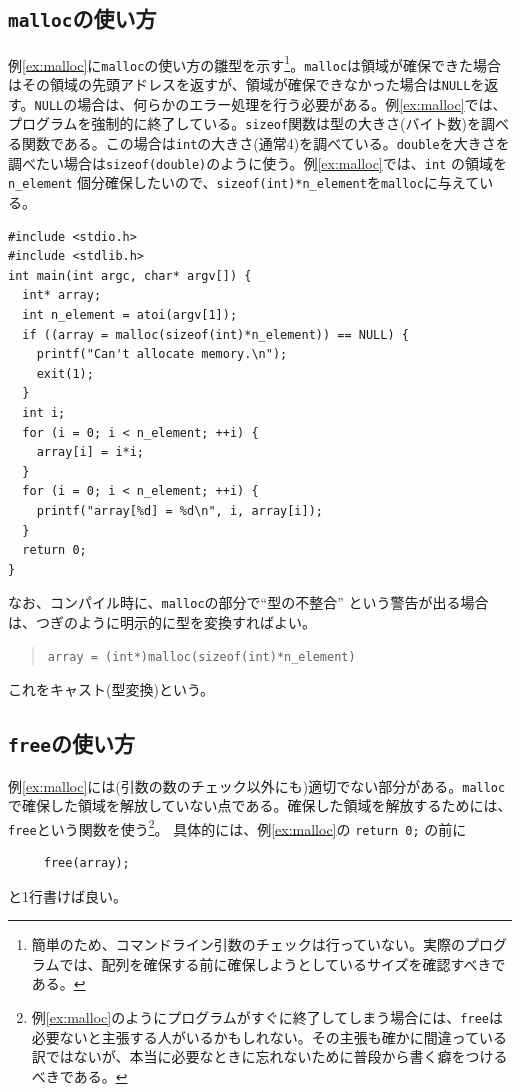 \subsection{{\tt malloc}の使い方}

例\ref{ex:malloc}に\verb|malloc|の使い方の雛型を示す\footnote{簡単のため、コマンドライン引数のチェックは行っていない。実際のプログラムでは、配列を確保する前に確保しようとしているサイズを確認すべきである。}。\verb|malloc|は領域が確保できた場合はその領域の先頭アドレスを返すが、領域が確保できなかった場合は\verb|NULL|を返す。\verb|NULL|の場合は、何らかのエラー処理を行う必要がある。例\ref{ex:malloc}では、プログラムを強制的に終了している。\verb|sizeof|関数は型の大きさ(バイト数)を調べる関数である。この場合は\verb|int|の大きさ(通常4)を調べている。\verb|double|を大きさを調べたい場合は\verb|sizeof(double)|のように使う。例\ref{ex:malloc}では、\verb|int| の領域を \verb|n_element| 個分確保したいので、\verb|sizeof(int)*n_element|を\verb|malloc|に与えている。
\begin{reidai}\label{ex:malloc}
\begin{verbatim}
#include <stdio.h>
#include <stdlib.h>
int main(int argc, char* argv[]) {
  int* array;
  int n_element = atoi(argv[1]);
  if ((array = malloc(sizeof(int)*n_element)) == NULL) {
    printf("Can't allocate memory.\n");
    exit(1);
  }
  int i;
  for (i = 0; i < n_element; ++i) {
    array[i] = i*i;
  }
  for (i = 0; i < n_element; ++i) {
    printf("array[%d] = %d\n", i, array[i]);
  }
  return 0;
}
\end{verbatim}
\end{reidai} \noindent
なお、コンパイル時に、{\tt malloc}の部分で``型の不整合'' という警告が出る場合は、つぎのように明示的に型を変換すればよい。
\begin{quote}
\begin{verbatim}
array = (int*)malloc(sizeof(int)*n_element)
\end{verbatim}
\end{quote}
これをキャスト(型変換)という。

\subsection{{\tt free}の使い方}

例\ref{ex:malloc}には(引数の数のチェック以外にも)適切でない部分がある。\verb|malloc|で確保した領域を解放していない点である。確保した領域を解放するためには、\verb|free|という関数を使う\footnote{例\ref{ex:malloc}のようにプログラムがすぐに終了してしまう場合には、{\tt free}は必要ないと主張する人がいるかもしれない。その主張も確かに間違っている訳ではないが、本当に必要なときに忘れないために普段から書く癖をつけるべきである。}。
具体的には、例\ref{ex:malloc}の \verb|return 0;| の前に
\begin{verbatim}
     free(array);
\end{verbatim}
と1行書けば良い。

